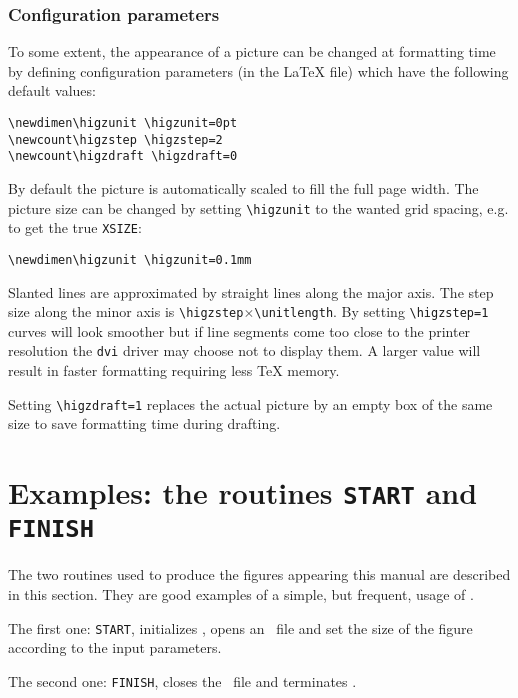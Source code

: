 \subsubsection{Configuration parameters}
To some extent, the appearance of a picture can be changed at formatting time
by defining configuration parameters (in the \LaTeX{} file) which have the
following default values:
\begin{verbatim}
\newdimen\higzunit \higzunit=0pt
\newcount\higzstep \higzstep=2
\newcount\higzdraft \higzdraft=0
\end{verbatim}
\par
{}
By default the picture is automatically scaled to fill the full page width.
The picture size can be changed by setting \verb'\higzunit' to the wanted grid
spacing, e.g. to get the true {\tt XSIZE}:
\begin{verbatim}
\newdimen\higzunit \higzunit=0.1mm
\end{verbatim}
\par
{}
Slanted lines are approximated by straight lines along the major axis.
The step size along the minor axis is
\verb'\higzstep'$\times$\verb'\unitlength'.
By setting \verb'\higzstep=1' curves will look smoother
but if line segments come too close to the printer resolution the
{\tt dvi} driver may choose not to display them.
A larger value will result in faster formatting requiring less \TeX{} memory.
\par
{}
Setting \verb'\higzdraft=1' replaces the actual picture by an empty box
of the same size to save formatting time during drafting.
%

\section{Examples: the routines {\tt START} and {\tt FINISH}}
The two routines used to produce the figures appearing this manual are
described in this section. They are good examples of a simple, but frequent,
usage of \HIGZ.

The first one: {\tt START}, initializes \HIGZ, opens an \EPS~file and set the
size of the figure according to the input parameters.

The second one: {\tt FINISH}, closes the \EPS~file and terminates \HIGZ.

